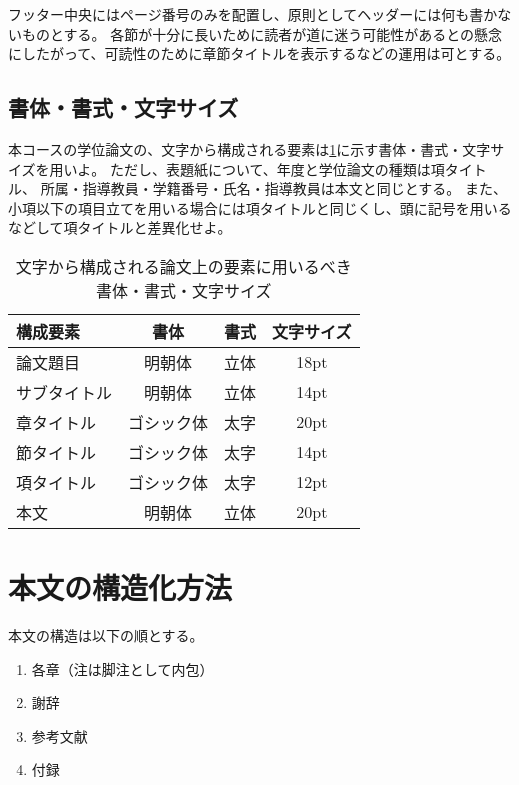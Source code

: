          フッター中央にはページ番号のみを配置し、原則としてヘッダーには何も書かないものとする。
          各節が十分に長いために読者が道に迷う可能性があるとの懸念にしたがって、可読性のために章節タイトルを表示するなどの運用は可とする。


    \subsection{書体・書式・文字サイズ}
      \label{sub:font}

      本コースの学位論文の、文字から構成される要素は\cref{tab:font}に示す書体・書式・文字サイズを用いよ。
      ただし、表題紙について、年度と学位論文の種類は項タイトル、
      所属・指導教員・学籍番号・氏名・指導教員は本文と同じとする。
      また、小項以下の項目立てを用いる場合には項タイトルと同じくし、頭に記号を用いるなどして項タイトルと差異化せよ。

      \begin{table}[tb]
        \caption{文字から構成される論文上の要素に用いるべき書体・書式・文字サイズ}
        \label{tab:font}
        \centering

        \begin{tabular}{l|ccc}
        \hline

        \hline
        \textbf{構成要素} & \textbf{書体} & \textbf{書式} & \textbf{文字サイズ}\\
        \hline
          論文題目 & 明朝体 & 立体 & 18pt \\
          サブタイトル & 明朝体 & 立体 & 14pt \\
          章タイトル & ゴシック体 & 太字 & 20pt \\
          節タイトル & ゴシック体 & 太字 & 14pt \\
          項タイトル & ゴシック体 & 太字 & 12pt \\
          本文 & 明朝体 & 立体 & 20pt \\
        \hline

        \hline
        \end{tabular}
      \end{table}

  \section{本文の構造化方法}
    \label{sec:structure}

    本文の構造は以下の順とする。

    \begin{enumerate}
      \item 各章（注は脚注として内包）
      \item 謝辞
      \item 参考文献
			\item 付録
    \end{enumerate}

